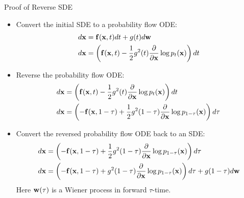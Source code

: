 \documentclass{beamer}
\begin{document}
\begin{frame}{Proof of Reverse SDE}
	\vspace{-0.3cm}
	\begin{itemize}
			\item Convert the initial SDE to a probability flow ODE:
			\vspace{-0.1cm}
			{\footnotesize
			\begin{align*}
				d\mathbf{x} &= \mathbf{f}(\mathbf{x}, t) dt + g(t) d \mathbf{w} \\
				d\mathbf{x} &= \left(\mathbf{f}(\mathbf{x}, t) -\frac{1}{2} g^2(t) \frac{\partial}{\partial \mathbf{x}} \log p_t(\mathbf{x}) \right) dt
			\end{align*}
			}
			\vspace{-0.5cm}
			\eqpause
			\item Reverse the probability flow ODE:
			\vspace{-0.1cm}
			{\footnotesize
			\begin{align*}
				d\mathbf{x} &= \left(\mathbf{f}(\mathbf{x}, t) -\frac{1}{2} g^2(t) \frac{\partial}{\partial \mathbf{x}} \log p_t(\mathbf{x}) \right) dt \\
				d\mathbf{x} &= \left(-\mathbf{f}(\mathbf{x}, 1 - \tau) + \frac{1}{2} g^2(1 - \tau) \frac{\partial}{\partial \mathbf{x}} \log p_{1 - \tau}(\mathbf{x}) \right) d\tau
			\end{align*}
			}
			\vspace{-0.5cm}
			\eqpause
			\item Convert the reversed probability flow ODE back to an SDE:
			\vspace{-0.1cm}
			{\footnotesize
			\begin{align*}
				d\mathbf{x} &= \left(-\mathbf{f}(\mathbf{x}, 1 - \tau) + \frac{1}{2} g^2(1 - \tau) \frac{\partial}{\partial \mathbf{x}} \log p_{1 - \tau}(\mathbf{x}) \right) d \tau \\
				d\mathbf{x} &= \left(-\mathbf{f}(\mathbf{x}, 1 - \tau) + g^2(1 - \tau) \frac{\partial}{\partial \mathbf{x}} \log p_{1 - \tau}(\mathbf{x}) \right) d \tau + g(1-\tau)d\mathbf{w}
			\end{align*}
			}
			Here $\mathbf{w}(\tau)$ is a Wiener process in forward $\tau$-time.
		\end{itemize}
\end{frame}
\end{document}
